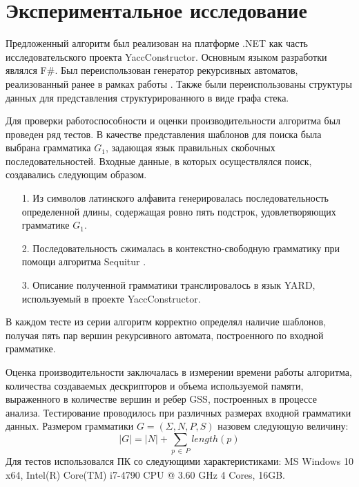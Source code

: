 \section{Экспериментальное исследование}

Предложенный алгоритм был реализован на платформе .NET как часть исследовательского проекта YaccConstructor. Основным языком разработки являлся F$\#$. Был переиспользован генератор рекурсивных автоматов, реализованный ранее в рамках работы \cite{Gorokhov2017ebnf}. Также были переиспользованы структуры данных для представления структурированного в виде графа стека.

Для проверки работоспособности и оценки производительности алгоритма был проведен ряд тестов. В качестве представления шаблонов для поиска была выбрана грамматика $G_1$, задающая язык правильных скобочных последовательностей. Входные данные, в которых осуществлялся поиск, создавались следующим образом.
\begin{itemize}
	\item[1.] Из символов латинского алфавита генерировалась последовательность определенной длины, содержащая ровно пять подстрок, удовлетворяющих грамматике $G_1$.
	\item[2.] Последовательность сжималась в контекстно-свободную грамматику при помощи алгоритма Sequitur \cite{sequitur, sequitur_url}.
	\item[3.] Описание полученной грамматики транслировалось в язык YARD, используемый в проекте YaccConstructor.
\end{itemize}
В каждом тесте из серии алгоритм корректно определял наличие шаблонов, получая пять пар вершин рекурсивного автомата, построенного по входной  грамматике. 

Оценка производительности заключалась в измерении времени работы алгоритма, количества создаваемых дескрипторов и объема используемой памяти, выраженного в количестве вершин и ребер GSS, построенных в процессе анализа. Тестирование проводилось при различных размерах входной грамматики данных. Размером грамматики $G = (\Sigma, N, P, S)$ назовем следующую величину:
$$|G| = |N| + \sum_{p \, \in \, P} length(p)$$ 
Для тестов использовался ПК со следующими характеристиками: \linebreak MS Windows 10 x64, Intel(R) Core(TM) i7-4790 CPU @ 3.60 GHz 4 Cores, 16GB.


